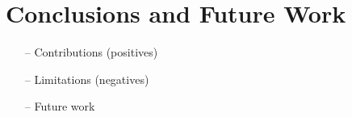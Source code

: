 \documentclass[english,12pt,a4paper,pdftex,sci,utf8]{aaltothesis}
\begin{document}
\clearpage
\section{Conclusions and Future Work} 
\label{sec:conclusions}

\begin{itemize}
\item[--]Contributions (positives)
\item[--]Limitations (negatives)
\item[--]Future work
\end{itemize}


\clearpage

{}

\printbibliography

\end{document}
